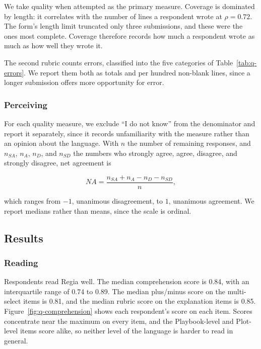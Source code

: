 We take quality when attempted as the primary measure. Coverage is dominated by length: it correlates with the number of lines a respondent wrote at $\rho = 0.72$. The form's length limit truncated only three submissions, and these were the ones most complete. Coverage therefore records how much a respondent wrote as much as how well they wrote it.
 
The second rubric counts errors, classified into the five categories of Table~\ref{tab:q-errors}. We report them both as totals and per hundred non-blank lines, since a longer submission offers more opportunity for error.
 
\subsubsection{Perceiving}
 
For each quality measure, we exclude ``I do not know'' from the denominator and report it separately, since it records unfamiliarity with the measure rather than an opinion about the language. With $n$ the number of remaining responses, and $n_{SA}$, $n_{A}$, $n_{D}$, and $n_{SD}$ the numbers who strongly agree, agree, disagree, and strongly disagree, net agreement is

\begin{equation}
NA = \frac{n_{SA} + n_{A} - n_{D} - n_{SD}}{n},
\end{equation}

which ranges from $-1$, unanimous disagreement, to $1$, unanimous agreement. We report medians rather than means, since the scale is ordinal.

\subsection{Results}
\label{sec:q-results}
 
\subsubsection{Reading}
 
Respondents read Regia well. The median comprehension score is 0.84, with an interquartile range of 0.74 to 0.89. The median plus/minus score on the multi-select items is 0.81, and the median rubric score on the explanation items is 0.85. Figure~\ref{fig:q-comprehension} shows each respondent's score on each item. Scores concentrate near the maximum on every item, and the Playbook-level and Plot-level items score alike, so neither level of the language is harder to read in general.
 
